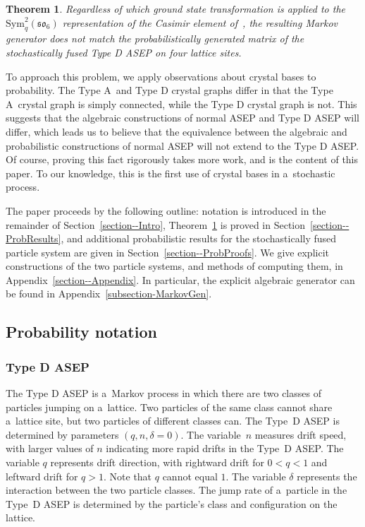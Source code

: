 \documentclass[pdftex]{sigma}
\numberwithin{equation}{section}
\newtheorem{Theorem}{Theorem}[section]
\theoremstyle{definition}
\begin{document}
\begin{Theorem} \label{thm-bigalgebra}
 Regardless of which ground state transformation is applied to the $\mathrm{Sym}^2_q(\mathfrak{so}_6)$ representation of the Casimir element of~{\rm\cite{kuan2020interactingparticlesystemstype}}, the resulting Markov generator does not match the probabilistically generated matrix of the stochastically fused Type D ASEP on four lattice sites.
\end{Theorem}

To approach this problem, we apply observations about crystal bases to probability. The Type A~and Type D crystal graphs differ in that the Type A~crystal graph is simply connected, while the Type D crystal graph is not. This suggests that the algebraic constructions of normal ASEP and Type D ASEP will differ, which leads us to believe that the equivalence between the algebraic and probabilistic constructions of normal ASEP will not extend to the Type D ASEP. Of course, proving this fact rigorously takes more work, and is the content of this paper. To our knowledge, this is the first use of crystal bases in a~stochastic process.

The paper proceeds by the following outline: notation is introduced in the remainder of Section~\ref{section--Intro}, Theorem~\ref{thm-bigalgebra} is proved in Section~\ref{section--ProbResults}, and additional probabilistic results for the stochastically fused particle system are given in Section~\ref{section--ProbProofs}. We give explicit constructions of the two particle systems, and methods of computing them, in Appendix~\ref{section--Appendix}. In particular, the explicit algebraic generator can be found in Appendix~\ref{subsection-MarkovGen}.

\subsection{Probability notation} \label{subsection--ProbNotation}
\subsubsection{Type D ASEP}
\label{TypeDASEPIntro}
The Type D ASEP is a~Markov process in which there are two classes of particles jumping on a~lattice. Two particles of the same class cannot share a~lattice site, but two particles of different classes can. The Type~D ASEP is determined by parameters $(q,n,\delta = 0)$. The variable~$n$ measures drift speed, with larger values of $n$ indicating more rapid drifts in the Type~D ASEP. The variable $q$ represents drift direction, with rightward drift for $0<q<1$ and leftward drift for $q > 1$. Note that $q$ cannot equal $1$. The variable $\delta$ represents the interaction between the two particle classes. The jump rate of a~particle in the Type~D ASEP is determined by the particle's class and configuration on the lattice.
\end{document}
